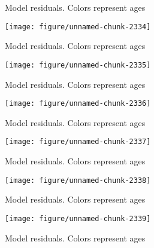 \documentclass[a4paper]{article}\usepackage{graphicx, color}
\makeatletter
\def\maxwidth{ %
  \ifdim\Gin@nat@width>\linewidth
    \linewidth
  \else
    \Gin@nat@width
  \fi
}
\newenvironment{knitrout}{}{} %
\makeatother
\begin{document}
\begin{knitrout}
\begin{figure}[H]
\caption[Model residuals]{Model residuals. Colors represent ages\label{fig:unnamed-chunk-2333}}
\end{figure}
\begin{figure}[H]


{\centering \texttt{[image: figure/unnamed-chunk-2334]} 

}

\caption[Model residuals]{Model residuals. Colors represent ages\label{fig:unnamed-chunk-2334}}
\end{figure}
\begin{figure}[H]


{\centering \texttt{[image: figure/unnamed-chunk-2335]} 

}

\caption[Model residuals]{Model residuals. Colors represent ages\label{fig:unnamed-chunk-2335}}
\end{figure}
\begin{figure}[H]


{\centering \texttt{[image: figure/unnamed-chunk-2336]} 

}

\caption[Model residuals]{Model residuals. Colors represent ages\label{fig:unnamed-chunk-2336}}
\end{figure}
\begin{figure}[H]


{\centering \texttt{[image: figure/unnamed-chunk-2337]} 

}

\caption[Model residuals]{Model residuals. Colors represent ages\label{fig:unnamed-chunk-2337}}
\end{figure}
\begin{figure}[H]


{\centering \texttt{[image: figure/unnamed-chunk-2338]} 

}

\caption[Model residuals]{Model residuals. Colors represent ages\label{fig:unnamed-chunk-2338}}
\end{figure}
\begin{figure}[H]


{\centering \texttt{[image: figure/unnamed-chunk-2339]} 

}

\caption[Model residuals]{Model residuals. Colors represent ages\label{fig:unnamed-chunk-2339}}
\end{figure}
\begin{figure}[H]



\end{figure}
\end{knitrout}
\end{document}
